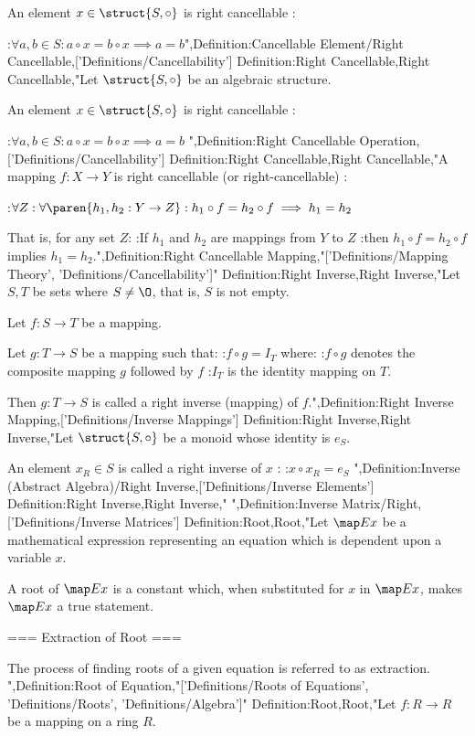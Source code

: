 An element $x \in \struct {S, \circ}$ is right cancellable :

:$\forall a, b \in S: a \circ x = b \circ x \implies a = b$",Definition:Cancellable Element/Right Cancellable,['Definitions/Cancellability']
Definition:Right Cancellable,Right Cancellable,"Let $\struct {S, \circ}$ be an algebraic structure.


An element $x \in \struct {S, \circ}$ is right cancellable :

:$\forall a, b \in S: a \circ x = b \circ x \implies a = b$
",Definition:Right Cancellable Operation,['Definitions/Cancellability']
Definition:Right Cancellable,Right Cancellable,"A mapping $f: X \to Y$ is right cancellable (or right-cancellable) :

:$\forall Z: \forall \paren {h_1, h_2: Y \to Z}: h_1 \circ f = h_2 \circ f \implies h_1 = h_2$

That is,  for any set $Z$:
:If $h_1$ and $h_2$ are mappings from $Y$ to $Z$
:then $h_1 \circ f = h_2 \circ f$ implies $h_1 = h_2$.",Definition:Right Cancellable Mapping,"['Definitions/Mapping Theory', 'Definitions/Cancellability']"
Definition:Right Inverse,Right Inverse,"Let $S, T$ be sets where $S \ne \O$, that is, $S$ is not empty.

Let $f: S \to T$ be a mapping.


Let $g: T \to S$ be a mapping such that:
:$f \circ g = I_T$
where:
:$f \circ g$ denotes the composite mapping $g$ followed by $f$
:$I_T$ is the identity mapping on $T$.


Then $g: T \to S$ is called a right inverse (mapping) of $f$.",Definition:Right Inverse Mapping,['Definitions/Inverse Mappings']
Definition:Right Inverse,Right Inverse,"Let $\struct {S, \circ}$ be a monoid whose identity is $e_S$.

An element $x_R \in S$ is called a right inverse of $x$ :
:$x \circ x_R = e_S$
",Definition:Inverse (Abstract Algebra)/Right Inverse,['Definitions/Inverse Elements']
Definition:Right Inverse,Right Inverse,"
",Definition:Inverse Matrix/Right,['Definitions/Inverse Matrices']
Definition:Root,Root,"Let $\map E x$ be a mathematical expression representing an equation which is dependent upon a variable $x$.

A root of $\map E x$ is a constant which, when substituted for $x$ in $\map E x$, makes $\map E x$ a true statement.


=== Extraction of Root ===

The process of finding roots of a given equation is referred to as extraction.
",Definition:Root of Equation,"['Definitions/Roots of Equations', 'Definitions/Roots', 'Definitions/Algebra']"
Definition:Root,Root,"Let $f: R \to R$ be a mapping on a ring $R$.

